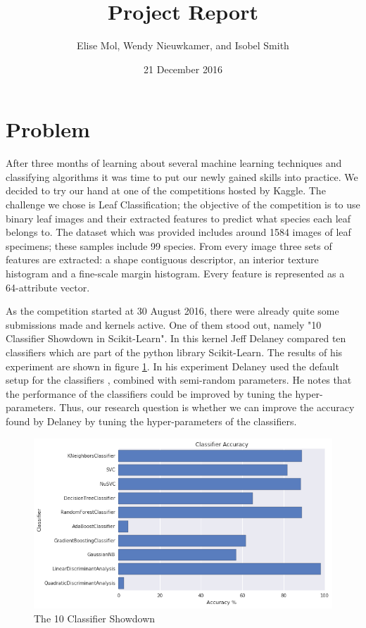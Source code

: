 \documentclass{article}
\title {Project Report}
\date{21 December 2016}
\author{Elise Mol, Wendy Nieuwkamer, and Isobel Smith}
\begin{document}
\maketitle

\section{Problem}
	
	After three months of learning about several machine learning techniques and classifying algorithms it was time to put our newly gained skills into practice. We decided to try our hand at one of the competitions hosted by Kaggle. The challenge we chose is Leaf Classification; the objective of the competition is to use binary leaf images and their extracted features to predict what species each leaf belongs to. The dataset which was provided includes around 1584 images of leaf specimens; these samples include 99 species. From every image three sets of features are extracted: a shape contiguous descriptor, an interior texture histogram and a fine-scale margin histogram. Every feature is represented as a 64-attribute vector. 
	
	As the competition started at 30 August 2016, there were already quite some submissions made and kernels active. One of them stood out, namely "10 Classifier Showdown in Scikit-Learn". In this kernel Jeff Delaney compared ten classifiers which are part of the python library Scikit-Learn. The results of his experiment are shown in figure \ref{fig:showdown}. In his experiment Delaney used the default setup for the classifiers , combined with semi-random parameters. He notes that the performance of the classifiers could be improved by tuning the hyper-parameters. Thus, our research question is whether we can improve the accuracy found by Delaney by tuning the hyper-parameters of the classifiers.
	
	\begin{figure} 
		\includegraphics[width=\linewidth]{results-showdown.png}
		\caption{The 10 Classifier Showdown}
		\label{fig:showdown}
	\end{figure}
	
\end{document}
